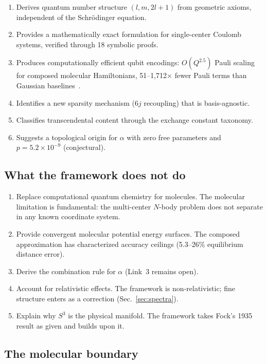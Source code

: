\documentclass[aps,pra,twocolumn,superscriptaddress,longbibliography]{revtex4-2}
\begin{document}
\begin{enumerate}
\item Derives quantum number structure $(l, m, 2l+1)$ from geometric
  axioms, independent of the Schr\"odinger equation.
\item Provides a mathematically exact formulation for single-center
  Coulomb systems, verified through 18 symbolic proofs.
\item Produces computationally efficient qubit encodings:
  $O(Q^{2.5})$ Pauli scaling for composed molecular Hamiltonians,
  51--1,712$\times$ fewer Pauli terms than Gaussian
  baselines~\cite{Paper14}.
\item Identifies a new sparsity mechanism (6$j$ recoupling) that is
  basis-agnostic.
\item Classifies transcendental content through the exchange constant
  taxonomy.
\item Suggests a topological origin for $\alpha$ with zero free
  parameters and $p = 5.2 \times 10^{-9}$ (conjectural).
\end{enumerate}

\subsection{What the framework does not do}

\begin{enumerate}
\item Replace computational quantum chemistry for molecules.  The
  molecular limitation is fundamental: the multi-center $N$-body
  problem does not separate in any known coordinate system.
\item Provide convergent molecular potential energy surfaces.  The
  composed approximation has characterized accuracy ceilings
  (5.3--26\% equilibrium distance error).
\item Derive the combination rule for $\alpha$ (Link~3 remains open).
\item Account for relativistic effects.  The framework is
  non-relativistic; fine structure enters as a correction
  (Sec.~\ref{sec:spectra}).
\item Explain why $S^3$ is the physical manifold.  The framework takes
  Fock's 1935 result as given and builds upon it.
\end{enumerate}

\subsection{The molecular boundary}
\end{document}
